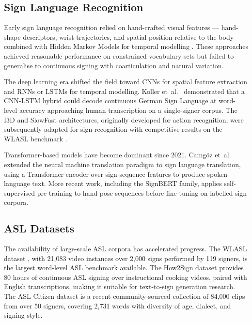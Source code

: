 \documentclass[12pt,a4paper,oneside]{report}
\begin{document}
\subsection{Sign Language Recognition}

Early sign language recognition relied on hand-crafted visual features --- hand-shape descriptors, wrist trajectories, and spatial position relative to the body --- combined with Hidden Markov Models for temporal modelling \cite{starner1995asl}. These approaches achieved reasonable performance on constrained vocabulary sets but failed to generalise to continuous signing with coarticulation and natural variation.

The deep learning era shifted the field toward CNNs for spatial feature extraction and RNNs or LSTMs for temporal modelling. Koller et~al.\ \cite{koller2015continuous} demonstrated that a CNN-LSTM hybrid could decode continuous German Sign Language at word-level accuracy approaching human transcription on a single-signer corpus. The I3D and SlowFast architectures, originally developed for action recognition, were subsequently adapted for sign recognition with competitive results on the WLASL benchmark \cite{li2020wlasl}.

Transformer-based models have become dominant since 2021. Camg\"oz et~al.\ \cite{camgoz2020sign} extended the neural machine translation paradigm to sign language translation, using a Transformer encoder over sign-sequence features to produce spoken-language text. More recent work, including the SignBERT family, applies self-supervised pre-training to hand-pose sequences before fine-tuning on labelled sign corpora.

\subsection{ASL Datasets}

The availability of large-scale ASL corpora has accelerated progress. The WLASL dataset \cite{li2020wlasl}, with 21,083 video instances over 2,000 signs performed by 119 signers, is the largest word-level ASL benchmark available. The How2Sign dataset \cite{duarte2021how2sign} provides 80 hours of continuous ASL signing over instructional cooking videos, paired with English transcriptions, making it suitable for text-to-sign generation research. The ASL Citizen dataset \cite{desai2023aslcitizen} is a recent community-sourced collection of 84,000 clips from over 50 signers, covering 2,731 words with diversity of age, dialect, and signing style.
\end{document}
